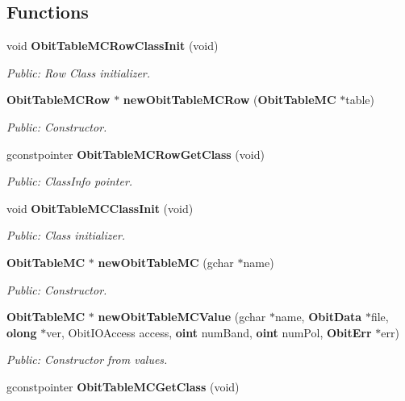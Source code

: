 \subsection*{Functions}
\begin{CompactItemize}
\item 
void {\bf Obit\-Table\-MCRow\-Class\-Init} (void)
\begin{CompactList}\small\item\em Public: Row Class initializer. \item\end{CompactList}\item 
{\bf Obit\-Table\-MCRow} $\ast$ {\bf new\-Obit\-Table\-MCRow} ({\bf Obit\-Table\-MC} $\ast$table)
\begin{CompactList}\small\item\em Public: Constructor. \item\end{CompactList}\item 
gconstpointer {\bf Obit\-Table\-MCRow\-Get\-Class} (void)
\begin{CompactList}\small\item\em Public: Class\-Info pointer. \item\end{CompactList}\item 
void {\bf Obit\-Table\-MCClass\-Init} (void)
\begin{CompactList}\small\item\em Public: Class initializer. \item\end{CompactList}\item 
{\bf Obit\-Table\-MC} $\ast$ {\bf new\-Obit\-Table\-MC} (gchar $\ast$name)
\begin{CompactList}\small\item\em Public: Constructor. \item\end{CompactList}\item 
{\bf Obit\-Table\-MC} $\ast$ {\bf new\-Obit\-Table\-MCValue} (gchar $\ast$name, {\bf Obit\-Data} $\ast$file, {\bf olong} $\ast$ver, Obit\-IOAccess access, {\bf oint} num\-Band, {\bf oint} num\-Pol, {\bf Obit\-Err} $\ast$err)
\begin{CompactList}\small\item\em Public: Constructor from values. \item\end{CompactList}\item 
gconstpointer {\bf Obit\-Table\-MCGet\-Class} (void)

\end{CompactItemize}
